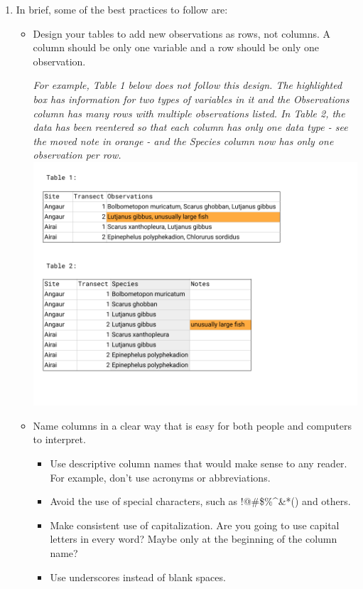 \documentclass[
]{book}
\begin{document}
\begin{enumerate}
\def\labelenumi{\arabic{enumi}.}
\item
  In brief, some of the best practices to follow are:

  \begin{itemize}
  \item
    Design your tables to add new observations as rows, not columns. A column should be only one variable and a row should be only one observation.

    \emph{For example, Table 1 below does not follow this design. The highlighted box has information for two types of variables in it and the Observations column has many rows with multiple observations listed. In Table 2, the data has been reentered so that each column has only one data type - see the moved note in orange - and the Species column now has only one observation per row.}
    \includegraphics{images/M2S2_image1_observations_in_rows_and_columns.png}
  \item
    Name columns in a clear way that is easy for both people and computers to interpret.

    \begin{itemize}
    \item
      Use descriptive column names that would make sense to any reader. For example, don't use acronyms or abbreviations.
    \item
      Avoid the use of special characters, such as !@\#\$\%\^{}\&*() and others.
    \item
      Make consistent use of capitalization. Are you going to use capital letters in every word? Maybe only at the beginning of the column name?
    \item
      Use underscores instead of blank spaces.


\end{itemize}
\end{itemize}
\end{enumerate}
\end{document}

